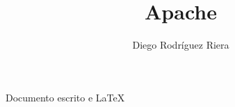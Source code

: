 \documentclass[a4paper,10pt]{article}
\title{Apache}
\author{Diego Rodríguez Riera}
\begin{document}
\maketitle
\pagebreak
\tableofcontents
\pagebreak



\raggedleft Documento escrito e \LaTeX{}
\end{document}
